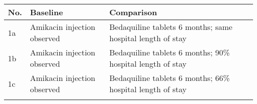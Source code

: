 \documentclass[]{article}
\begin{document}
\begin{longtable}[]{@{}lll@{}}
\toprule
\begin{minipage}[b]{0.08\columnwidth}\raggedright
No.\strut
\end{minipage} & \begin{minipage}[b]{0.41\columnwidth}\raggedright
Baseline\strut
\end{minipage} & \begin{minipage}[b]{0.41\columnwidth}\raggedright
Comparison\strut
\end{minipage}\tabularnewline
\midrule
\endhead
\begin{minipage}[t]{0.08\columnwidth}\raggedright
1a\strut
\end{minipage} & \begin{minipage}[t]{0.41\columnwidth}\raggedright
Amikacin injection observed\strut
\end{minipage} & \begin{minipage}[t]{0.41\columnwidth}\raggedright
Bedaquiline tablets 6 months; same hospital length of stay\strut
\end{minipage}\tabularnewline
\begin{minipage}[t]{0.08\columnwidth}\raggedright
1b\strut
\end{minipage} & \begin{minipage}[t]{0.41\columnwidth}\raggedright
Amikacin injection observed\strut
\end{minipage} & \begin{minipage}[t]{0.41\columnwidth}\raggedright
Bedaquiline tablets 6 months; 90\% hospital length of stay\strut
\end{minipage}\tabularnewline
\begin{minipage}[t]{0.08\columnwidth}\raggedright
1c\strut
\end{minipage} & \begin{minipage}[t]{0.41\columnwidth}\raggedright
Amikacin injection observed\strut
\end{minipage} & \begin{minipage}[t]{0.41\columnwidth}\raggedright
Bedaquiline tablets 6 months; 66\% hospital length of stay\strut
\end{minipage}\tabularnewline
\begin{minipage}[t]{0.08\columnwidth}\raggedright
\strut
\end{minipage} & \begin{minipage}[t]{0.41\columnwidth}\raggedright
\strut
\end{minipage} & \begin{minipage}[t]{0.41\columnwidth}\raggedright

\end{minipage}
\end{longtable}
\end{document}
